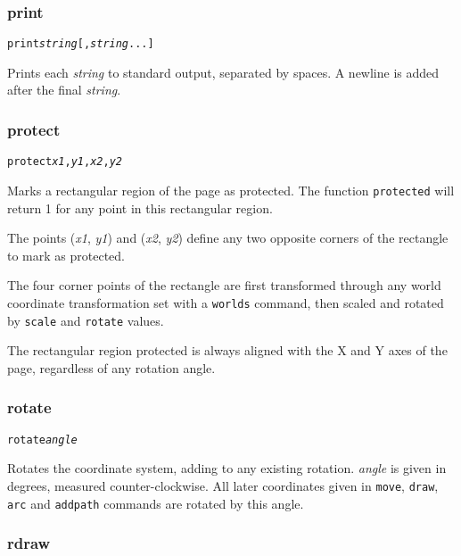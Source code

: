\subsubsection{print}

\begin{alltt}
print \textit{string} [, \textit{string} ...]
\end{alltt}

Prints each \textit{string} to standard output,
separated by spaces.
A newline is added after the final \textit{string}.

\subsubsection{protect}

\begin{alltt}
protect \textit{x1}, \textit{y1}, \textit{x2}, \textit{y2}
\end{alltt}

Marks a rectangular region of the page as protected.
The function \texttt{protected} will return 1 for any
point in this rectangular region.

The points
(\textit{x1}, \textit{y1}) and (\textit{x2}, \textit{y2}) define
any two opposite corners of the rectangle to mark as protected.

The four corner points of the rectangle
are first transformed through any world coordinate
transformation set with a \texttt{worlds} command,
then scaled and rotated by \texttt{scale}
and \texttt{rotate} values.

The rectangular region protected is always aligned with the X
and Y axes of the page, regardless of any rotation angle.

\subsubsection{rotate}

\begin{alltt}
rotate \textit{angle}
\end{alltt}

Rotates the coordinate system, adding to any existing rotation.  \textit{angle}
is given in degrees, measured counter-clockwise.  All later coordinates given
in \texttt{move}, \texttt{draw}, \texttt{arc} and \texttt{addpath} commands are
rotated by this angle.

\subsubsection{rdraw}

